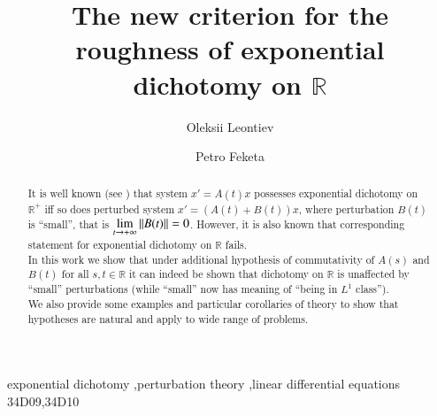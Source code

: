 \documentclass{elsarticle}
\theoremstyle{remark}
\begin{document}
\begin{frontmatter}

\title{The new criterion for the roughness of exponential dichotomy on $\mathbb{R}$}

\author[todai]{Oleksii Leontiev}
\author[erfurt]{Petro Feketa}


\address[erfurt]{Erfurt University of Applied Sciences}
\address[todai]{The University of Tokyo}

\begin{abstract}
	It is well known (see \cite{coppel1978dichotomies})
	that system $x'=A(t)x$ possesses exponential dichotomy on $\mathbb{R}^+$ iff so does perturbed system
	$x'=(A(t)+B(t))x$, where perturbation $B(t)$ is ``small'', that is $\lim_{t\to+\infty}\mynorm{B(t)}=0$. However, it is also
	known that corresponding statement for exponential dichotomy on $\mathbb{R}$ fails.\\
	In this work we show that under additional hypothesis of commutativity of $A(s)$ and $B(t)$ for all $s,t\in\mathbb{R}$
	it can indeed be shown that dichotomy on $\mathbb{R}$ is unaffected by ``small'' perturbations (while ``small'' now
	has meaning of ``being in $L^1$ class'').\\
	We also provide some examples and particular corollaries of theory to show that hypotheses are natural and apply to wide
	range of problems.
\end{abstract}

\begin{keyword}
exponential dichotomy \sep perturbation theory \sep linear differential equations
\MSC[2010] 34D09\sep 34D10
\end{keyword}

\end{frontmatter}

\linenumbers
\end{document}
